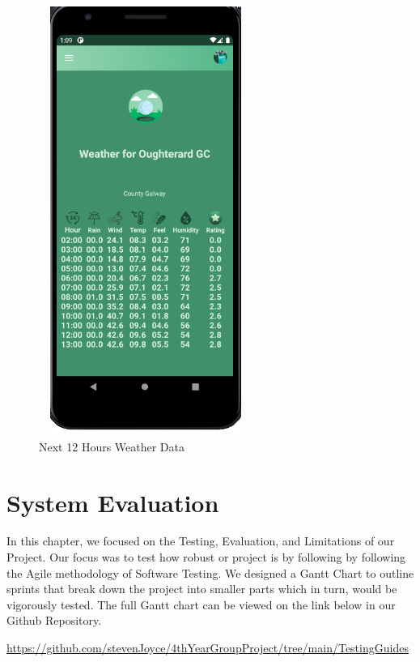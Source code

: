 \begin{figure}[H]
    \centering
    \includegraphics[width=7cm,height = 14cm]{img/HourlyDataOutput.PNG}
    \caption{ Next 12 Hours Weather Data}
    \label{fig:altas config}
\end{figure}


\chapter{System Evaluation}
In this chapter, we focused on the Testing, Evaluation, and Limitations of our Project. Our focus was to test how robust or project is by following by following the Agile methodology of Software Testing. We designed a Gantt Chart to outline sprints that break down the project into smaller parts which in turn, would be vigorously tested. The full Gantt chart can be viewed on the link below in our Github Repository.
\newline

\url{https://github.com/stevenJoyce/4thYearGroupProject/tree/main/TestingGuides}


